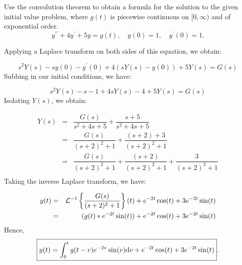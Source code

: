 \documentclass[11pt]{article}
\begin{document}
\begin{problem}
Use the convolution theorem to obtain a formula for the solution to the given initial value problem, where $g(t)$ is piecewise continuous on $[0,\infty)$ and of exponential order.
\begin{equation*}
y^{\prime \prime} + 4y^{\prime} + 5 y = g(t), \quad y(0)=1, \quad y^{\prime}(0)=1.
\end{equation*}
\end{problem}
\begin{solution}
Applying a Laplace transform on both sides of this equation, we obtain:

\begin{equation*}
s^2 Y(s) -sy(0) - y^{\prime}(0) + 4(sY(s) - y(0))+5Y(s) = G(s)
\end{equation*}
Subbing in our initial conditions, we have:

\begin{equation*}
s^2 Y(s) -s - 1 + 4sY(s) -4 +5Y(s) = G(s)
\end{equation*}
Isolating $Y(s)$, we obtain:

\begin{eqnarray*}
Y(s) & = & \dfrac{G(s)}{s^2+4s+5} + \dfrac{s+5}{s^2+4s+5} \\
& = & \dfrac{G(s)}{(s+2)^2+1} + \dfrac{(s+2)+3}{(s+2)^2+1} \\
& = & \dfrac{G(s)}{(s+2)^2+1} + \dfrac{(s+2)}{(s+2)^2+1} + \dfrac{3}{(s+2)^2+1} \\
\end{eqnarray*}
Taking the inverse Laplace transform, we have:

\begin{eqnarray*}
y(t) & = & {\cal L}^{-1} \left\{ \dfrac{G(s)}{(s+2)^2+1} \right\}(t) + e^{-2t}\cos(t) + 3e^{-2t}\sin(t) \\
& = & (g(t) * e^{-2t}\sin(t))  + e^{-2t}\cos(t) + 3e^{-2t}\sin(t)
\end{eqnarray*}
Hence, 
\[ \boxed{ y(t) = \int_{0}^{t} g(t-v)e^{-2v}\sin(v) {\rm d} v  + e^{-2t}\cos(t) + 3e^{-2t}\sin(t) }. \]
\end{solution}
\end{document}

